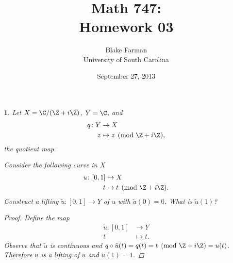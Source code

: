 \documentclass[10pt]{amsart}
\author{Blake Farman\\University of South Carolina}
\title{Math 747:\\Homework 03}
\date{September 27, 2013}
\begin{document}
\maketitle

\providecommand{\p}{\mathfrak{p}}
\providecommand{\m}{\mathfrak{m}}

\newtheorem{thm}{}
\newtheorem{lem}{Lemma}
\newtheorem{prop}{Proposition}
\theoremstyle{definition}
\newtheorem{defn}{Definition}[thm]

\newcommand{\A}{\mathbb{A}}

\begin{thm}
  Let $X = \C/(\Z + i\Z)$, $Y = \C$, and 
  \begin{align*}
    q \colon Y & \rightarrow X\\
    z & \mapsto z \pmod{\Z + i\Z},
  \end{align*}
  the quotient map.
  
  Consider the following curve in $X$
  \begin{align*}
    u \colon [0,1] & \rightarrow X\\
    t & \mapsto t \pmod{\Z + i\Z}.
  \end{align*}
  Construct a lifting $\tilde{u} \colon [0,1] \rightarrow Y$ of $u$ with $\tilde{u}(0) = 0$.
  What is $\tilde{u}(1)$?

  \begin{proof}
    Define the map
    \begin{align*}
      \tilde{u} \colon [0,1] & \rightarrow Y\\
      t & \mapsto t.
    \end{align*}
    Observe that $\tilde{u}$ is continuous and $q \circ \tilde{u}(t) = q(t) = t \pmod{\Z + i\Z} = u(t)$.
    Therefore $\tilde{u}$ is a lifting of $u$ and $\tilde{u}(1) = 1$.
  \end{proof}
\end{thm}
\end{document}

